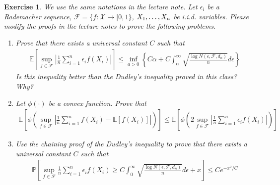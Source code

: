 \documentclass[12pt]{article}
\theoremstyle{colon}
\newtheorem{exercise}{Exercise}
\begin{document}
\begin{exercise}
  We use the same notations in the lecture note. Let $\epsilon_i$ be a Rademacher sequence, $\mathcal{F} = \{f : \mathcal{X} \rightarrow [0,1\}$, $X_1, \mathellipsis, X_n$ be i.i.d. variables. Please modify the proofs in the lecture notes to prove the following problems.
  \begin{enumerate}[label=\arabic*)]
    \item Prove that there exists a universal constant $C$ such that
      \begin{gather*}
        \mathbb{E} \left[ \sup_{f \in \mathcal{F}} \left\lvert \frac{1}{n} \sum_{i=1}^n \epsilon_i f(X_i) \right\rvert \right] \leq \inf_{a > 0} \left\{ C \alpha + C \int_\alpha^\infty \sqrt{\frac{\log N(\epsilon, \mathcal{F}, d_n)}{n}} d\epsilon \right\}
      \end{gather*}
      Is this inequality better than the Dudley's inequality proved in this class? Why?
    \item Let $\phi(\cdot)$ be a convex function. Prove that
      \begin{gather*}
        \mathbb{E} \left[ \phi \left( \sup_{f \in \mathcal{F}} \left\lvert \frac{1}{n} \sum_{i=1}^n f(X_i) - \mathbb{E}[f(X_i)] \right\rvert \right) \right] \leq \mathbb{E} \left[ \phi \left( 2 \sup_{f \in \mathcal{F}} \left\lvert \frac{1}{n} \sum_{i=1}^n \epsilon_i f(X_i) \right\rvert  \right) \right]
      \end{gather*}
    \item Use the chaining proof of the Dudley's inequality to prove that there exists a universal constant $C$ such that
      \begin{gather*}
        \mathbb{P} \left[ \sup_{f \in \mathcal{F}} \frac{1}{n} \sum_{i=1}^n \epsilon_i f(X_i) \geq C \int_0^\infty \sqrt{\frac{\log N(\epsilon, \mathcal{F}, d_n)}{n}} d\epsilon + x \right] \leq C e^{-x^2/C}
      \end{gather*}
  \end{enumerate}
\end{exercise}
\end{document}
